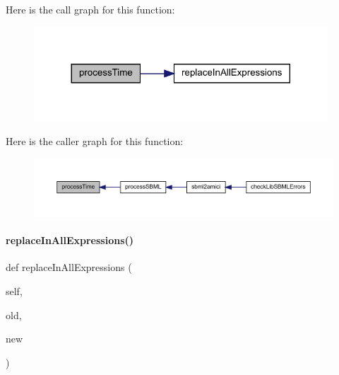 Here is the call graph for this function\+:
\nopagebreak
\begin{figure}[H]
\begin{center}
\leavevmode
\includegraphics[width=312pt]{classamici_1_1sbml__import_1_1_sbml_importer_a2819c6ad1b541e49e728aa172e57208e_cgraph}
\end{center}
\end{figure}
Here is the caller graph for this function\+:
\nopagebreak
\begin{figure}[H]
\begin{center}
\leavevmode
\includegraphics[width=350pt]{classamici_1_1sbml__import_1_1_sbml_importer_a2819c6ad1b541e49e728aa172e57208e_icgraph}
\end{center}
\end{figure}
\mbox{\label{classamici_1_1sbml__import_1_1_sbml_importer_a1579faf8b188de11ed58ddbebc3c20a7}} 
\paragraph{\texorpdfstring{replace\+In\+All\+Expressions()}{replaceInAllExpressions()}}
{\footnotesize\ttfamily def replace\+In\+All\+Expressions (\begin{DoxyParamCaption}\item[{}]{self,  }\item[{}]{old,  }\item[{}]{new }\end{DoxyParamCaption})}



